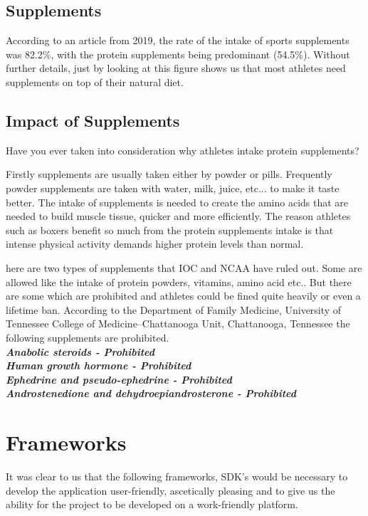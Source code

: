 \documentclass[a4paper,12pt]{report}
\begin{document}
\subsection{Supplements}
According to an article from 2019, the rate of the intake of sports supplements was 82.2\%, with the protein supplements being predominant (54.5\%). Without further details, just by looking at this figure shows us that most athletes need supplements on top of their natural diet.\cite{Supplements} 

\subsection{Impact of Supplements}
Have you ever taken into consideration why athletes intake protein supplements?

Firstly supplements are usually taken either by powder or pills. Frequently powder supplements are taken with water, milk, juice, etc... to make it taste better. The intake of supplements is needed to create the amino acids that are needed to build muscle tissue, quicker and more efficiently. The reason athletes such as boxers benefit so much from the protein supplements intake is that intense physical activity demands higher protein levels than normal.

here are two types of supplements that IOC and NCAA have ruled out. Some are allowed like the intake of protein powders, vitamins, amino acid etc.. But there are some which are prohibited and athletes could be fined quite heavily or even a lifetime ban. According to the Department of Family Medicine, University of Tennessee College of Medicine–Chattanooga Unit, Chattanooga, Tennessee the following supplements are prohibited. \cite{jenkinson2008supplements} \\

\textbf{\emph{Anabolic steroids - Prohibited\\ Human growth hormone - Prohibited\\Ephedrine and pseudo-ephedrine - Prohibited\\Androstenedione and dehydroepiandrosterone - Prohibited}} 


\section{Frameworks}
It was clear to us that the following frameworks, SDK's would be necessary to develop the application user-friendly, ascetically pleasing and to give us the ability for the project to be developed on a work-friendly platform.
\end{document}
